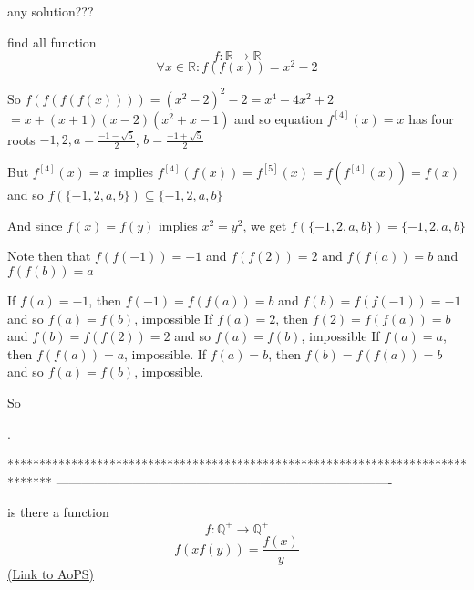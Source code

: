 \begin{solution}
	any solution???
\end{solution}



\begin{solution}
	\begin{tcolorbox}find all function
\[f:\mathbb{R}\rightarrow \mathbb{R}\]
\[\forall x\in \mathbb{R}: f(f(x))=x^{2}-2\]\end{tcolorbox}
So $f(f(f(f(x))))=(x^2-2)^2-2=x^4-4x^2+2$ $=x+(x+1)(x-2)(x^2+x-1)$ and so equation $f^{[4]}(x)=x$ has four roots $-1,2,a=\frac{-1-\sqrt 5}2$, $b=\frac{-1+\sqrt 5}2$

But $f^{[4]}(x)=x$ implies $f^{[4]}(f(x))=f^{[5]}(x)=f(f^{[4]}(x))=f(x)$ and so $f(\{-1,2,a,b\})\subseteq \{-1,2,a,b\}$

And since $f(x)=f(y)$ implies $x^2=y^2$, we get $f(\{-1,2,a,b\})=\{-1,2,a,b\}$

Note then that $f(f(-1))=-1$ and $f(f(2))=2$ and $f(f(a))=b$ and $f(f(b))=a$

If $f(a)=-1$, then $f(-1)=f(f(a))=b$ and $f(b)=f(f(-1))=-1$ and so $f(a)=f(b)$, impossible
If $f(a)=2$, then $f(2)=f(f(a))=b$ and $f(b)=f(f(2))=2$ and so $f(a)=f(b)$, impossible
If $f(a)=a$, then $f(f(a))=a$, impossible.
If $f(a)=b$, then $f(b)=f(f(a))=b$ and so $f(a)=f(b)$, impossible.

So .
\end{solution}
*******************************************************************************
-------------------------------------------------------------------------------

\begin{problem}
	is there a function 
\[f:\mathbb{Q}^{+}\rightarrow \mathbb{Q}^{+}\]
\[f(xf(y))=\frac{f(x)}{y}\]
	\flushright \href{https://artofproblemsolving.com/community/c6h570151}{(Link to AoPS)}
\end{problem}



